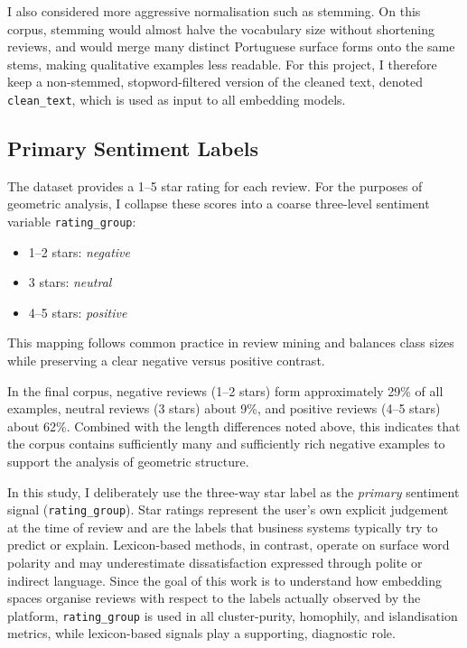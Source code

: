 \documentclass[a4paper,11pt]{article}
\begin{document}
I also considered more aggressive normalisation such as stemming. 
On this corpus, stemming would almost halve the vocabulary size without shortening reviews, and would merge many distinct Portuguese surface forms onto the same stems, making qualitative examples less readable. 
For this project, I therefore keep a non-stemmed, stopword-filtered version of the cleaned text, denoted \texttt{clean\_text}, which is used as input to all embedding models.

\subsection{Primary Sentiment Labels}
\label{subsec:rating-group}
The dataset provides a 1--5 star rating for each review. 
For the purposes of geometric analysis, I collapse these scores into a coarse three-level sentiment variable \texttt{rating\_group}:
\begin{itemize}
    \item 1--2 stars: \emph{negative}
    \item 3 stars: \emph{neutral}
    \item 4--5 stars: \emph{positive}
\end{itemize}
This mapping follows common practice in review mining and balances class sizes while preserving a clear negative versus positive contrast.

In the final corpus, negative reviews (1--2 stars) form approximately 29\% of all examples, neutral reviews (3 stars) about 9\%, and positive reviews (4--5 stars) about 62\%. 
Combined with the length differences noted above, this indicates that the corpus contains sufficiently many and sufficiently rich negative examples to support the analysis of geometric structure.

In this study, I deliberately use the three-way star label as the \emph{primary} sentiment signal (\texttt{rating\_group}). 
Star ratings represent the user's own explicit judgement at the time of review and are the labels that business systems typically try to predict or explain. 
Lexicon-based methods, in contrast, operate on surface word polarity and may underestimate dissatisfaction expressed through polite or indirect language. 
Since the goal of this work is to understand how embedding spaces organise reviews with respect to the labels actually observed by the platform, \texttt{rating\_group} is used in all cluster-purity, homophily, and islandisation metrics, while lexicon-based signals play a supporting, diagnostic role.
\end{document}
